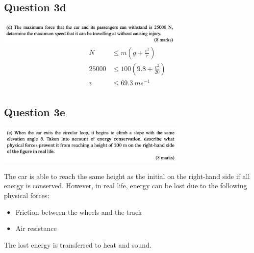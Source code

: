 \documentclass{article}
\begin{document}
\subsection*{Question 3d}
\includegraphics[width=0.7\textwidth]{img/A4Q3d.jpg}
\begin{align*}
    N     & \le m(g + \frac{v^2}{r})      \\
    25000 & \le 100(9.8 + \frac{v^2}{20}) \\
    v     & \le 69.3\ ms^{-1}             \\
\end{align*}
\subsection*{Question 3e}
\includegraphics[width=0.7\textwidth]{img/A4Q3e.jpg}

The car is able to reach the same height as the initial on the right-hand side if all energy is conserved. However, in real life, energy can be lost due to the following physical forces:
\begin{itemize}
    \item Friction between the wheels and the track
    \item Air resistance
\end{itemize}
The lost energy is transferred to heat and sound.
\end{document}
